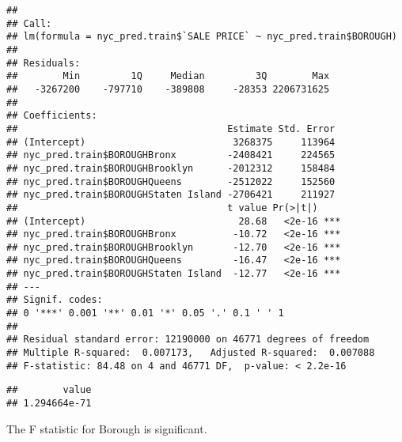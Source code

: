 \documentclass[
  a3paper,
]{article}
\newenvironment{Shaded}{\begin{snugshade}}{\end{snugshade}}
\newcommand{\CommentTok}[1]{\textcolor[rgb]{0.56,0.35,0.01}{\textit{#1}}}
\newcommand{\DataTypeTok}[1]{\textcolor[rgb]{0.13,0.29,0.53}{#1}}
\newcommand{\DecValTok}[1]{\textcolor[rgb]{0.00,0.00,0.81}{#1}}
\newcommand{\KeywordTok}[1]{\textcolor[rgb]{0.13,0.29,0.53}{\textbf{#1}}}
\newcommand{\NormalTok}[1]{#1}
\newcommand{\OperatorTok}[1]{\textcolor[rgb]{0.81,0.36,0.00}{\textbf{#1}}}
\newcommand{\OtherTok}[1]{\textcolor[rgb]{0.56,0.35,0.01}{#1}}
\newcommand{\StringTok}[1]{\textcolor[rgb]{0.31,0.60,0.02}{#1}}
\begin{document}
\begin{verbatim}
## 
## Call:
## lm(formula = nyc_pred.train$`SALE PRICE` ~ nyc_pred.train$BOROUGH)
## 
## Residuals:
##        Min         1Q     Median         3Q        Max 
##   -3267200    -797710    -389808     -28353 2206731625 
## 
## Coefficients:
##                                     Estimate Std. Error
## (Intercept)                          3268375     113964
## nyc_pred.train$BOROUGHBronx         -2408421     224565
## nyc_pred.train$BOROUGHBrooklyn      -2012312     158484
## nyc_pred.train$BOROUGHQueens        -2512022     152560
## nyc_pred.train$BOROUGHStaten Island -2706421     211927
##                                     t value Pr(>|t|)    
## (Intercept)                           28.68   <2e-16 ***
## nyc_pred.train$BOROUGHBronx          -10.72   <2e-16 ***
## nyc_pred.train$BOROUGHBrooklyn       -12.70   <2e-16 ***
## nyc_pred.train$BOROUGHQueens         -16.47   <2e-16 ***
## nyc_pred.train$BOROUGHStaten Island  -12.77   <2e-16 ***
## ---
## Signif. codes:  
## 0 '***' 0.001 '**' 0.01 '*' 0.05 '.' 0.1 ' ' 1
## 
## Residual standard error: 12190000 on 46771 degrees of freedom
## Multiple R-squared:  0.007173,   Adjusted R-squared:  0.007088 
## F-statistic: 84.48 on 4 and 46771 DF,  p-value: < 2.2e-16
\end{verbatim}

\begin{Shaded}
\end{Shaded}

\begin{verbatim}
##        value 
## 1.294664e-71
\end{verbatim}

The F statistic for Borough is significant.

\begin{Shaded}
\end{Shaded}
\end{document}
